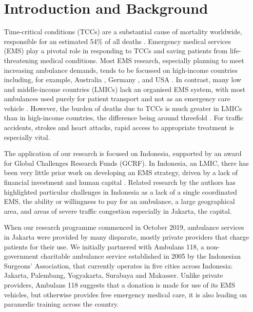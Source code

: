 \documentclass[numbers,webpdf,imaman]{ima-authoring-template}%
\begin{document}


\maketitle


\section{Introduction and Background}\label{sec:intro}
Time-critical conditions (TCCs) are a substantial cause of mortality
worldwide, responsible for an estimated 54\% of all deaths \citep{FraserBMJ}.
Emergency medical services (EMS) play a pivotal role in responding to TCCs and
saving patients from life-threatening medical conditions. Most EMS research,
especially  planning to meet increasing ambulance demands, tends to be
focussed on high-income countries including, for example, Australia
\citep{lowthian2011increasing}, Germany \citep{veser2015demographic}, and USA
\citep{birmingham2021trends}. In contrast, many low and middle-income countries
(LMICs) lack an organised EMS system, with most ambulances used purely for
patient transport and not as an emergency care vehicle \citep{plummer2017ems}.
However, the burden of deaths due to TCCs is much greater in LMICs than in
high-income countries, the difference being around threefold \citep{ChangPMC}.
For traffic accidents, strokes and heart attacks, rapid access to appropriate
treatment is especially vital. 

The application of our research is focused on Indonesia, supported by an
award for Global Challenges Research Funds (GCRF). In Indonesia, an LMIC,
there has been very little prior work on developing an EMS strategy, driven
by a lack of financial investment and human capital
\citep{plummer2017ems,pusponegoro2003terrorism,yusvirazi2018state}.
Related research by the authors \citep{BriceSyaribahNoor2022Esui} has
highlighted particular challenges in Indonesia as a lack of a single
coordinated EMS, the ability or willingness to pay for an ambulance, a large
geographical area, and areas of severe traffic congestion especially in
Jakarta, the capital.  

When our research programme commenced in October 2019, ambulance services in
Jakarta were provided by many disparate, mostly private providers that charge
patients for their use. We initially partnered with Ambulans 118, a
non-government charitable ambulance service established in 2005 by the
Indonesian Surgeons’ Association, that  currently operates in five cities across
Indonesia: Jakarta, Palembang, Yogyakarta, Surabaya and Makasser. Unlike private
providers, Ambulans 118 suggests that a donation is made for use of its EMS
vehicles, but otherwise provides free emergency medical care, it is also leading
on paramedic training across the country. 
\end{document}
